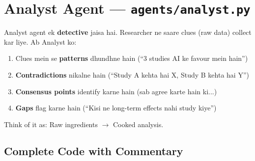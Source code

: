 \documentclass[12pt, a4paper]{article}
\begin{document}
\newpage
\section{Analyst Agent --- \texttt{agents/analyst.py}}

\begin{storybox}
Analyst agent ek \textbf{detective} jaisa hai. Researcher ne saare clues (raw data) collect kar liye. Ab Analyst ko:
\begin{enumerate}
\item Clues mein se \textbf{patterns} dhundhne hain (``3 studies AI ke favour mein hain'')
\item \textbf{Contradictions} nikalne hain (``Study A kehta hai X, Study B kehta hai Y'')
\item \textbf{Consensus points} identify karne hain (sab agree karte hain ki...)
\item \textbf{Gaps} flag karne hain (``Kisi ne long-term effects nahi study kiye'')
\end{enumerate}
Think of it as: Raw ingredients $\rightarrow$ Cooked analysis.
\end{storybox}

\subsection{Complete Code with Commentary}
\end{document}
